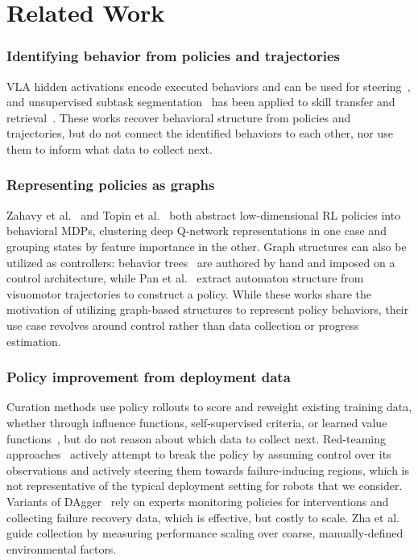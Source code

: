 \documentclass[letterpaper, 10 pt, conference]{ieeeconf}
\begin{document}
\section{Related Work}

\subsubsection{Identifying behavior from policies and trajectories} VLA hidden activations encode executed behaviors and can be used for steering~\cite{swann_sparse_2026, jin_eventgrounded_2026}, and unsupervised subtask segmentation~\cite{blank2026sparc, yang_unsupervised_2025, wang_grounding_2024} has been applied to skill transfer and retrieval~\cite{sharma_robosubtasknet_2026, memmel_strap_2025, chen_backbone_2025}. These works recover behavioral structure from policies and trajectories, but do not connect the identified behaviors to each other, nor use them to inform what data to collect next.

\subsubsection{Representing policies as graphs} Zahavy et al.~\cite{zahavy_graying_2016} and Topin et al.~\cite{topin_generation_2019} both abstract low-dimensional RL policies into behavioral MDPs, clustering deep Q-network representations in one case and grouping states by feature importance in the other. Graph structures can also be utilized as controllers: behavior trees~\cite{iovino_survey_2022} are authored by hand and imposed on a control architecture, while Pan et al.~\cite{pan2026emergentneuralautomatonpolicies} extract automaton structure from visuomotor trajectories to construct a policy. While these works share the motivation of utilizing graph-based structures to represent policy behaviors, their use case revolves around control rather than data collection or progress estimation.

\subsubsection{Policy improvement from deployment data} Curation methods use policy rollouts to score and reweight existing training data, whether through influence functions, self-supervised criteria, or learned value functions~\cite{agia_cupid_2025, zhang_scizor_2025, intelligence2025pi06vlalearnsexperience}, but do not reason about which data to collect next. Red-teaming approaches~\cite{karnik2024embodied, majumdar2025predictive} actively attempt to break the policy by assuming control over its observations and actively steering them towards failure-inducing regions, which is not representative of the typical deployment setting for robots that we consider. Variants of DAgger~\cite{ross_reduction_2011, kelly2019hgdaggerinteractiveimitationlearning} rely on experts monitoring policies for interventions and collecting failure recovery data, which is effective, but costly to scale. Zha et al.~\cite{zha_guiding_2025} guide collection by measuring performance scaling over coarse, manually-defined environmental factors.
\end{document}
